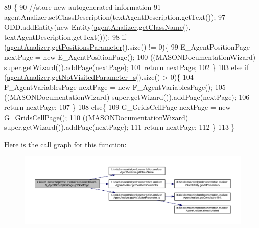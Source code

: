 \begin{DoxyCode}
89                                     \{ 
90         \textcolor{comment}{//store new autogenerated information}
91         agentAnalizer.setClassDescription(textAgentDescription.getText());
97         ODD.addEntity(\textcolor{keyword}{new} Entity(\hyperlink{classit_1_1isislab_1_1masonhelperdocumentation_1_1mason_1_1wizards_1_1_d___agent_description_page_a2a9e05cc43fedb16d75050620d30f712}{agentAnalizer}.\hyperlink{classit_1_1isislab_1_1masonhelperdocumentation_1_1analizer_1_1_agent_analizer_ace466e16439878a851eb63d5a11ddf43}{getClassName}(), 
      textAgentDescription.getText()));   
98         \textcolor{keywordflow}{if} (\hyperlink{classit_1_1isislab_1_1masonhelperdocumentation_1_1mason_1_1wizards_1_1_d___agent_description_page_a2a9e05cc43fedb16d75050620d30f712}{agentAnalizer}.\hyperlink{classit_1_1isislab_1_1masonhelperdocumentation_1_1analizer_1_1_agent_analizer_aa2e85956f4a23176c398294cf02d859d}{getPositionsParameter}().size() != 0)\{
99             E\_AgentPositionPage nextPage = \textcolor{keyword}{new} E\_AgentPositionPage();
100             ((MASONDocumentationWizard) super.getWizard()).addPage(nextPage); 
101             \textcolor{keywordflow}{return} nextPage; 
102         \}
103         \textcolor{keywordflow}{else} \textcolor{keywordflow}{if} (\hyperlink{classit_1_1isislab_1_1masonhelperdocumentation_1_1mason_1_1wizards_1_1_d___agent_description_page_a2a9e05cc43fedb16d75050620d30f712}{agentAnalizer}.\hyperlink{classit_1_1isislab_1_1masonhelperdocumentation_1_1analizer_1_1_agent_analizer_a9fdb36c2a505d7ad2459d70f413216d0}{getNotVisitedParameter\_s}().size() > 0)\{
104             F\_AgentVariablesPage nextPage = \textcolor{keyword}{new} F\_AgentVariablesPage();
105             ((MASONDocumentationWizard) super.getWizard()).addPage(nextPage);
106             \textcolor{keywordflow}{return} nextPage; 
107         \}
108         \textcolor{keywordflow}{else}\{
109             G\_GridsCellPage nextPage = \textcolor{keyword}{new} G\_GridsCellPage();
110             ((MASONDocumentationWizard) super.getWizard()).addPage(nextPage);
111             \textcolor{keywordflow}{return} nextPage; 
112         \}
113     \}
\end{DoxyCode}


Here is the call graph for this function\-:
\nopagebreak
\begin{figure}[H]
\begin{center}
\leavevmode
\includegraphics[width=350pt]{classit_1_1isislab_1_1masonhelperdocumentation_1_1mason_1_1wizards_1_1_d___agent_description_page_afc7ea33cd58dacc353ffd209027279fc_cgraph}
\end{center}
\end{figure}


